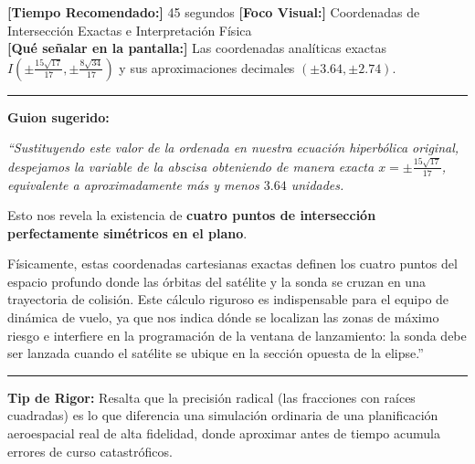 \documentclass[12pt,letterpaper]{article}
\begin{document}
\begin{tcolorbox}[colframe=USSBlue, colback=white, title=\textbf{DIAPOSITIVA 26: Coordenadas de Colisión Orbital (Pág. 26)}, coltitle=white]
    \small
    \textbf{[Tiempo Recomendado:]} 45 segundos \hfill \textbf{[Foco Visual:]} Coordenadas de Intersección Exactas e Interpretación Física \\
    \textbf{[Qué señalar en la pantalla:]} Las coordenadas analíticas exactas $I\left( \pm \frac{15\sqrt{17}}{17}, \pm \frac{8\sqrt{34}}{17} \right)$ y sus aproximaciones decimales $(\pm 3.64, \pm 2.74)$.
    \hrule\vspace{0.2cm}
    \textbf{Guion sugerido:}
    \medskip
    
    {\itshape
    ``Sustituyendo este valor de la ordenada en nuestra ecuación hiperbólica original, despejamos la variable de la abscisa obteniendo de manera exacta $x = \pm \frac{15\sqrt{17}}{17}$, equivalente a aproximadamente más y menos $3.64$ unidades.
    
    Esto nos revela la existencia de \textbf{cuatro puntos de intersección perfectamente simétricos en el plano}. 
    
    Físicamente, estas coordenadas cartesianas exactas definen los cuatro puntos del espacio profundo donde las órbitas del satélite y la sonda se cruzan en una trayectoria de colisión. Este cálculo riguroso es indispensable para el equipo de dinámica de vuelo, ya que nos indica dónde se localizan las zonas de máximo riesgo e interfiere en la programación de la ventana de lanzamiento: la sonda debe ser lanzada cuando el satélite se ubique en la sección opuesta de la elipse.''}
    \vspace{0.2cm}\hrule\vspace{0.15cm}
    \textbf{Tip de Rigor:} Resalta que la precisión radical (las fracciones con raíces cuadradas) es lo que diferencia una simulación ordinaria de una planificación aeroespacial real de alta fidelidad, donde aproximar antes de tiempo acumula errores de curso catastróficos.
\end{tcolorbox}

\vspace{0.3cm}
\end{document}
